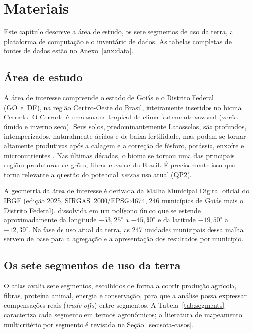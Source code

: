 \chapter{Materiais}\label{ch:materials}

Este capítulo descreve a área de estudo, os sete segmentos de uso da terra, a plataforma de computação
e o inventário de dados. As tabelas completas de fontes de dados estão no Anexo~\ref{anx:data}.

\section{Área de estudo}

A área de interesse compreende o estado de Goiás e o Distrito Federal (GO~e~DF), na região Centro-Oeste
do Brasil, inteiramente inseridos no bioma Cerrado. O Cerrado é uma savana tropical de clima fortemente
sazonal (verão úmido e inverno seco). Seus solos, predominantemente Latossolos, são profundos,
intemperizados, naturalmente ácidos e de baixa fertilidade, mas podem se tornar altamente produtivos
após a calagem e a correção de fósforo, potássio, enxofre e micronutrientes
\citep[p.~617]{yamada_cerrado_2005}. Nas últimas décadas, o bioma se tornou uma das principais regiões
produtoras de grãos, fibras e carne do Brasil. É precisamente isso que torna relevante a questão do
potencial \emph{versus} uso atual (QP2).

A geometria da área de interesse é derivada da Malha Municipal Digital oficial do IBGE (edição 2025,
SIRGAS~2000/EPSG:4674, 246 municípios de Goiás mais o Distrito Federal), dissolvida em um polígono único
que se estende aproximadamente da longitude $-53{,}25^\circ$ a $-45{,}90^\circ$ e da latitude
$-19{,}50^\circ$ a $-12{,}39^\circ$. Na fase de uso atual da terra, as 247 unidades municipais dessa
malha servem de base para a agregação e a apresentação dos resultados por município.

\section{Os sete segmentos de uso da terra}

O atlas avalia sete segmentos, escolhidos de forma a cobrir produção agrícola, fibras, proteína animal,
energia e conservação, para que a análise possa expressar compensações reais (\emph{trade-offs}) entre
segmentos. A Tabela~\ref{tab:segments} caracteriza cada segmento em termos agronômicos; a literatura de
mapeamento multicritério por segmento é revisada na Seção~\ref{sec:sota-casos}.

